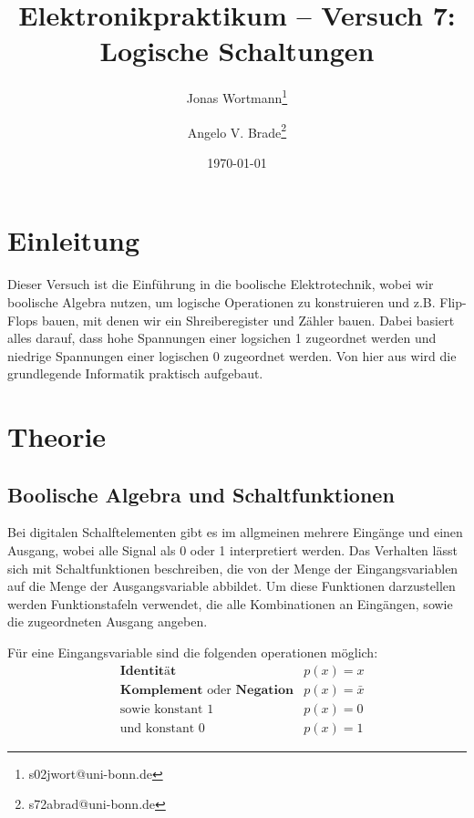 \documentclass[10pt]{article}
\title{Elektronikpraktikum -- Versuch 7: Logische Schaltungen}
\author[1]{Jonas Wortmann\thanks{s02jwort@uni-bonn.de}}
\author[1]{Angelo V. Brade\thanks{s72abrad@uni-bonn.de}}
\affil[1]{Rheinische Friedrich-Wilhelms-Universität Bonn}
\date{\today}
\begin{document}
\maketitle
\newpage

\tableofcontents
\newpage


\pagestyle{fancy}
\fancyhead[R]{\thepage}
\fancyhead[L]{\leftmark}


\begin{multicols}{2}
	\section{Einleitung}
	Dieser Versuch ist die Einführung in die boolische Elektrotechnik, wobei wir boolische Algebra nutzen, um logische Operationen zu konstruieren und z.B. Flip-Flops bauen, mit denen wir ein Shreiberegister und Zähler bauen. Dabei basiert alles darauf, dass hohe Spannungen einer logsichen 1 zugeordnet werden und niedrige Spannungen einer logischen 0 zugeordnet werden. Von hier aus wird die grundlegende Informatik praktisch aufgebaut.

	\section{Theorie}
	\subsection{Boolische Algebra und Schaltfunktionen}
	Bei digitalen Schalftelementen gibt es im allgmeinen mehrere Eingänge und einen Ausgang, wobei alle Signal als 0 oder 1 interpretiert werden. Das Verhalten lässt sich mit Schaltfunktionen beschreiben, die von der Menge der Eingangsvariablen auf die Menge der Ausgangsvariable abbildet. Um diese Funktionen darzustellen werden Funktionstafeln verwendet, die alle Kombinationen an Eingängen, sowie die zugeordneten Ausgang angeben.

	Für eine Eingangsvariable sind die folgenden operationen möglich:
	\begin{align*}
		 & \textbf{Identität}                                  & p(x) = x       \\
		 & \textbf{Komplement} \text{ oder } \textbf{Negation} & p(x) = \bar{x} \\
		 & \text{sowie konstant 1}                             & p(x) = 0       \\
		 & \text{und konstant 0}                               & p(x) = 1
	\end{align*}


\end{multicols}
\end{document}
